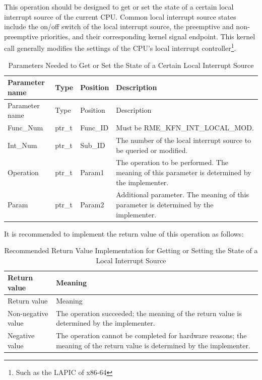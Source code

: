 This operation should be designed to get or set the state of a certain local interrupt source of the current CPU. Common local interrupt source states include the on/off switch of the local interrupt source, the preemptive and non-preemptive priorities, and their corresponding kernel signal endpoint. This kernel call generally modifies the settings of the CPU's local interrupt controller\footnote{Such as the LAPIC of x86-64}.

\begin{xltabular}{\textwidth}{@{}>{\hsize\raggedright\arraybackslash}X>{\hsize\raggedright\arraybackslash}X>{\hsize\raggedright\arraybackslash}X>{\hsize\raggedright\arraybackslash}X@{}}
\caption{Parameters Needed to Get or Set the State of a Certain Local Interrupt Source}\label{tab:8-16-get-or-set-local-interrupt-source-state-parameters}\\
\toprule
Parameter name & Type & Position & Description\tabularnewline
\endfirsthead
\toprule
Parameter name & Type & Position & Description\tabularnewline
\midrule
\endhead
\bottomrule
\endlastfoot
Func\_Num & ptr\_t & Func\_ID & Must be RME\_KFN\_INT\_LOCAL\_MOD.\tabularnewline
Int\_Num & ptr\_t & Sub\_ID &
The number of the local interrupt source to be queried or modified.\tabularnewline
Operation & ptr\_t & Param1 &
The operation to be performed. The meaning of this parameter is determined by the implementer.\tabularnewline
Param & ptr\_t & Param2 &
Additional parameter. The meaning of this parameter is determined by the implementer.\tabularnewline
\end{xltabular}
\nopagebreak[4]

It is recommended to implement the return value of this operation as follows:

\begin{xltabular}{\textwidth}{@{}>{\hsize\raggedright\arraybackslash}X>{\hsize\raggedright\arraybackslash}X@{}}
\caption{Recommended Return Value Implementation for Getting or Setting the State of a Local Interrupt Source}\label{tab:8-17-get-or-set-local-interrupt-source-state-suggested-return-values}\\
\toprule
Return value & Meaning\tabularnewline
\endfirsthead
\toprule
Return value & Meaning\tabularnewline
\midrule
\endhead
\bottomrule
\endlastfoot
    Non-negative value & The operation succeeded; the meaning of the return value is determined by the implementer.\tabularnewline
    Negative value & The operation cannot be completed for hardware reasons; the meaning of the return value is determined by the implementer.\tabularnewline
\end{xltabular}
\nopagebreak[4]

